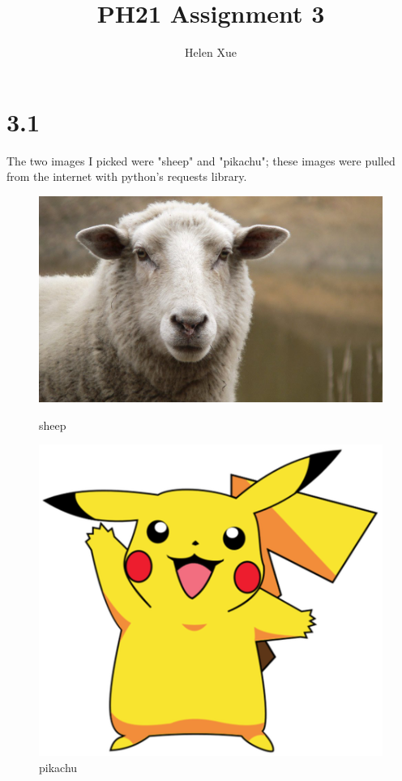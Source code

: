 \documentclass[a4paper,11pt,english]{article}
\title{PH21 Assignment 3}
\author{Helen Xue}
\begin{document}
\maketitle

\section{3.1}
The two images I picked were "sheep" and "pikachu"; these images were pulled from the internet with python's requests library.

\begin{figure}[H]
	\includegraphics[width=\linewidth]{sheep/sheep}
	\caption{sheep}  
\endminipage \hfill
{}
	\includegraphics[width=\linewidth]{pikachu/pikachu}
	\caption{pikachu} 
\endminipage \hfill
\end{figure}
\end{document}
